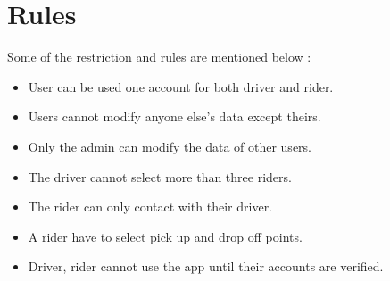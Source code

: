 \section{Rules}
Some of the restriction and rules are mentioned below :
\begin{itemize}
\item User can be used one account for both driver and rider.
\item Users cannot modify anyone else’s data except theirs.
\item Only the admin can modify the data of other users.
\item The driver cannot select more than three riders.
\item The rider can only contact with their driver.
\item A rider have to select pick up and drop off points.
\item Driver, rider cannot use the app until their accounts are verified.
\end{itemize}
